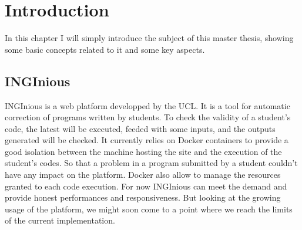 \chapter{Introduction}

In this chapter I will simply introduce the subject of this master thesis, showing some basic concepts related to it and some key aspects.

\section{INGInious}

INGInious is a web platform developped by the UCL.  It is a tool for automatic correction of programs written by students. To check the validity of a student's code, the latest will be executed, feeded with some inputs, and the outputs generated will be checked. It currently relies on Docker containers to provide a good isolation between the machine hosting the site and the execution of the student's codes.  So that a problem in a program submitted by a student couldn't have any impact on the platform.  Docker also allow to manage the resources granted to each code execution.  For now INGInious can meet the demand and provide honest performances and responsiveness.  But looking at the growing usage of the platform, we might soon come to a point where we reach the limits of the current implementation.

